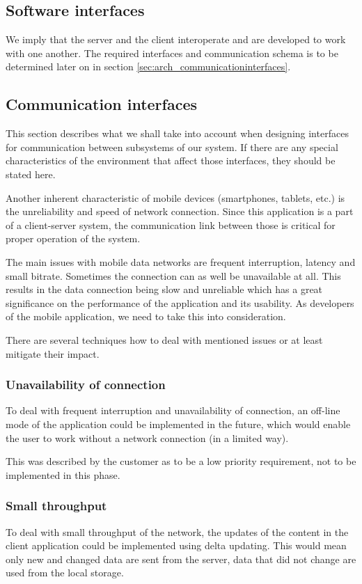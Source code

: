 \documentclass[11pt]{book}
\begin{document}
\subsection{Software interfaces}
We imply that the server and the client interoperate and are developed to work with one another. The required interfaces and communication schema is to be determined later on in section \ref{sec:arch_communicationinterfaces}.

\subsection{Communication interfaces}
This section describes what we shall take into account when designing interfaces for communication between subsystems of our system. If there are any special characteristics of the environment that affect those interfaces, they should be stated here.

Another inherent characteristic of mobile devices (smartphones, tablets, etc.) is the unreliability and speed of network connection. Since this application is a part of a client-server system, the communication link between those is critical for proper operation of the system.

The main issues with mobile data networks are frequent interruption, latency and small bitrate. Sometimes the connection can as well be unavailable at all. This results in the data connection being slow and unreliable which has a great significance on the performance of the application and its usability. As developers of the mobile application, we need to take this into consideration.

There are several techniques how to deal with mentioned issues or at least mitigate their impact.

\subsubsection{Unavailability of connection}\label{sec:req_unavailability_of_connection}
To deal with frequent interruption and unavailability of connection, an off-line mode of the application could be implemented in the future, which would enable the user to work without a network connection (in a limited way).

This was described by the customer as to be a low priority requirement, not to be implemented in this phase.

\subsubsection{Small throughput}
To deal with small throughput of the network, the updates of the content in the client application could be implemented using delta updating. This would mean only new and changed data are sent from the server, data that did not change are used from the local storage.
\end{document}
